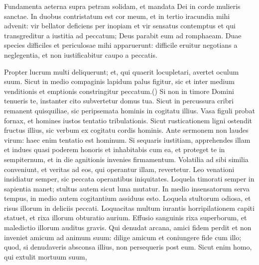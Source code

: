 \begin{biblechapter}
\begin{biblechapter}
\begin{biblechapter}
\begin{biblechapter}
\begin{biblechapter}
\begin{biblechapter}
\begin{biblechapter}
\begin{biblechapter}
\begin{biblechapter}
\begin{biblechapter}
\begin{biblechapter}
\begin{biblechapter}
\begin{biblechapter}
\begin{biblechapter}
\begin{biblechapter}
\begin{biblechapter}
\begin{biblechapter}
\begin{biblechapter}
\begin{biblechapter}
\begin{biblechapter}
\begin{biblechapter}
\begin{biblechapter}
\begin{biblechapter}
\begin{biblechapter}
\begin{biblechapter}
\begin{biblechapter}
 \verse Fundamenta aeterna supra petram solidam,
 et mandata Dei in corde mulieris sanctae.
 \verse In duobus contristatum est cor meum,
 et in tertio iracundia mihi advenit:
 \verse vir bellator deficiens per inopiam
 et vir sensatus contemptus
 \verse et qui transgreditur a iustitia ad peccatum;
 Deus parabit eum ad romphaeam.
 \verse Duae species difficiles et periculosae mihi apparuerunt:
 difficile eruitur negotians a neglegentia,
 et non iustificabitur caupo a peccatis.
 
\begin{biblechapter}
\verse Propter lucrum multi deliquerunt;
 et, qui quaerit locupletari, avertet oculum suum.
 \verse Sicut in medio compaginis lapidum palus figitur,
 sic et inter medium venditionis et emptionis constringitur peccatum.(\verse)
 \verse Si non in timore Domini tenueris te,
 instanter cito subvertetur domus tua.
 \verse Sicut in percussura cribri remanent quisquiliae,
 sic peripsemata hominis in cogitatu illius.
 \verse Vasa figuli probat fornax,
 et homines iustos tentatio tribulationis.
 \verse Sicut rusticationem ligni ostendit fructus illius,
 sic verbum ex cogitatu cordis hominis.
 \verse Ante sermonem non laudes virum:
 haec enim tentatio est hominum.
 \verse Si sequaris iustitiam, apprehendes illam
 et indues quasi poderem honoris
 et inhabitabis cum ea, et proteget te in sempiternum,
 et in die agnitionis invenies firmamentum.
 \verse Volatilia ad sibi similia conveniunt,
 et veritas ad eos, qui operantur illam, revertetur.
 \verse Leo venationi insidiatur semper,
 sic peccata operantibus iniquitates.
 \verse Loquela timorati semper in sapientia manet;
 stultus autem sicut luna mutatur.
 \verse In medio insensatorum serva tempus,
 in medio autem cogitantium assiduus esto.
 \verse Loquela stultorum odiosa,
 et risus illorum in deliciis peccati.
 \verse Loquacitas multum iurantis horripilationem capiti statuet,
 et rixa illorum obturatio aurium.
 \verse Effusio sanguinis rixa superborum,
 et maledictio illorum auditus gravis.
 \verse Qui denudat arcana, amici fidem perdit
 et non inveniet amicum ad animum suum:
 \verse dilige amicum et coniungere fide cum illo;
 \verse quod, si denudaveris absconsa illius,
 non persequeris post eum.
 \verse Sicut enim homo, qui extulit mortuum suum,

\end{biblechapter}
\end{biblechapter}
\end{biblechapter}
\end{biblechapter}
\end{biblechapter}
\end{biblechapter}
\end{biblechapter}
\end{biblechapter}
\end{biblechapter}
\end{biblechapter}
\end{biblechapter}
\end{biblechapter}
\end{biblechapter}
\end{biblechapter}
\end{biblechapter}
\end{biblechapter}
\end{biblechapter}
\end{biblechapter}
\end{biblechapter}
\end{biblechapter}
\end{biblechapter}
\end{biblechapter}
\end{biblechapter}
\end{biblechapter}
\end{biblechapter}
\end{biblechapter}
\end{biblechapter}
